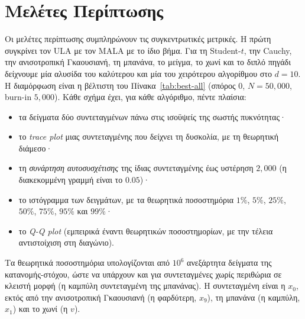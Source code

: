 \section{Μελέτες Περίπτωσης}
\label{sec:case-studies}

Οι μελέτες περίπτωσης συμπληρώνουν τις συγκεντρωτικές μετρικές. Η πρώτη συγκρίνει
τον ULA με τον MALA με το ίδιο βήμα. Για τη Student-$t$, την Cauchy, την ανισοτροπική
Γκαουσιανή, τη μπανάνα, το μείγμα, το χωνί και το διπλό πηγάδι δείχνουμε μία αλυσίδα
του καλύτερου και μία του χειρότερου αλγορίθμου στο $d=10$. Η διαμόρφωση είναι η
βέλτιστη του Πίνακα~\ref{tab:best-all} (σπόρος $0$, $N=50{,}000$,
burn-in $5{,}000$). Κάθε σχήμα έχει, για κάθε αλγόριθμο, πέντε πλαίσια:
\begin{itemize}
  \item τα δείγματα δύο συντεταγμένων πάνω στις ισοϋψείς της σωστής πυκνότητας·
  \item το \emph{trace plot} μιας συντεταγμένης που δείχνει τη δυσκολία, με τη
        θεωρητική διάμεσο·
  \item τη \emph{συνάρτηση αυτοσυσχέτισης} της ίδιας συντεταγμένης έως υστέρηση
        $2{,}000$ (η διακεκομμένη γραμμή είναι το $0.05$)·
  \item το ιστόγραμμα των δειγμάτων, με τα θεωρητικά ποσοστημόρια $1\%$, $5\%$,
        $25\%$, $50\%$, $75\%$, $95\%$ και $99\%$·
  \item το \emph{Q-Q plot} (εμπειρικά έναντι θεωρητικών ποσοστημορίων, με την
        τέλεια αντιστοίχιση στη διαγώνιο).
\end{itemize}
Τα θεωρητικά ποσοστημόρια υπολογίζονται από $10^6$ ανεξάρτητα δείγματα της
κατανομής-στόχου, ώστε να υπάρχουν και για συντεταγμένες χωρίς περιθώρια σε κλειστή
μορφή (η καμπύλη συντεταγμένη της μπανάνας). Η συντεταγμένη είναι η $x_0$, εκτός από
την ανισοτροπική Γκαουσιανή (η φαρδύτερη, $x_9$), τη μπανάνα (η καμπύλη, $x_1$) και το
χωνί (η $v$).

